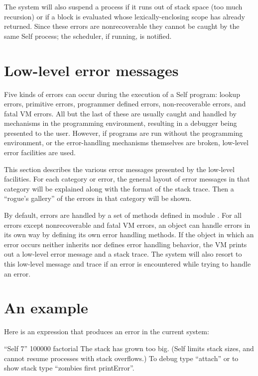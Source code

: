 \documentclass[letterpaper,10pt,english]{sphinxmanual}
\begin{document}
The system will also suspend a process if it runs out of stack space (too much recursion) or if a
block is evaluated whose lexically-enclosing scope has already returned. Since these errors are
nonrecoverable they cannot be caught by the same Self process; the scheduler, if running, is notified.


\section{Low-level error messages}
\label{\detokenize{vmref:low-level-error-messages}}
Five kinds of errors can occur during the execution of a Self program: lookup errors, primitive errors,
programmer defined errors, non-recoverable errors, and fatal VM errors. All but the last of
these are usually caught and handled by mechanisms in the programming environment, resulting
in a debugger being presented to the user. However, if programs are run without the programming
environment, or the error-handling mechanisms themselves are broken, low-level error facilities
are used.

This section describes the various error messages presented by the low-level facilities. For each
category or error, the general layout of error messages in that category will be explained along with
the format of the stack trace. Then a “rogue’s gallery” of the errors in that category will be shown.

By default, errors are handled by a set of methods defined in module . For all errors
except nonrecoverable and fatal VM errors, an object can handle errors in its own way by defining
its own error handling methods. If the object in which an error occurs neither inherits nor
defines error handling behavior, the VM prints out a low-level error message and a stack trace. The
system will also resort to this low-level message and trace if an error is encountered while trying
to handle an error.


\section{An example}
\label{\detokenize{vmref:an-example}}
Here is an expression that produces an error in the current system:

\begin{sphinxVerbatim}[commandchars=\\\{\}]
“Self 7” 100000 factorial
The stack has grown too big.
(Self limits stack sizes, and cannot resume processes with stack overflows.)
To debug type “attach” or to show stack type “zombies first printError”.
\end{sphinxVerbatim}
\end{document}
